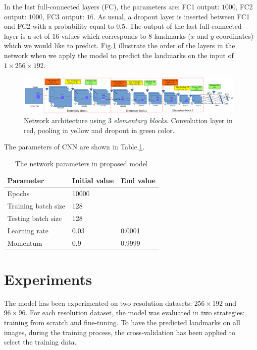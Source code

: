 \documentclass[12pt,a4paper]{article}
\begin{document}
In the last full-connected layers (FC), the parameters are: FC1
output: $1000$, FC2 output: $1000$, FC3 output: $16$. As usual, a
dropout layer is inserted between FC1 ond FC2 with a probability equal to $0.5$. The output of the last full-connected layer is a set of $16$ values which corresponds to 8 landmarks ($x$ and $y$ coordinates) which we would like to predict. Fig.\ref{cnnnetwork2} illustrate the order of the layers in the network when we apply the model to predict the landmarks on the input of $1 \times 256 \times 192$.

\begin{figure}[h]
\centering
\includegraphics[scale=0.3]{images/cnn_newdatasize/arch_model}
\caption{{\small{Network architecture using $3$ \textit{elementary blocks}.
  Convolution
  layer in red, pooling in yellow and dropout in green color.}}} 
\label{cnnnetwork2}
\end{figure}

The parameters of CNN are shown in Table.\ref{model2parameters}.
\begin{table}[h!]
	\centering
	\begin{tabular}{l l l}
	Parameter & Initial value & End value \\ \hline
	Epochs & 10000 &  \\ \hline
	Training batch size & 128 & \\ \hline
	Testing batch size & 128 & \\ \hline
	Learning rate & 0.03 & 0.0001 \\ \hline
	Momentum & 0.9 & 0.9999 \\ \hline
	\end{tabular}
	\caption{The network parameters in proposed model}
	\label{model2parameters}
\end{table}
\section{Experiments}
\label{secexpr}
The model has been experimented on two resolution datasets: $256 \times 192$ and $96 \times 96$. For each resolution dataset, the model was evaluated in two strategies: training from scratch and fine-tuning. To have the predicted landmarks on all images, during the training process, the cross-validation has been applied to select the training data.
\end{document}
